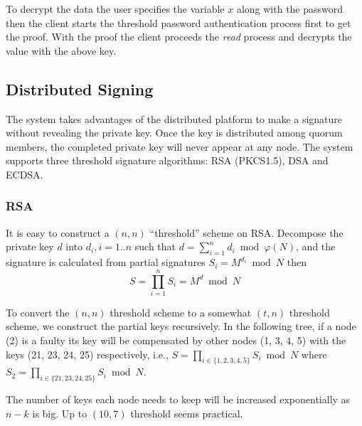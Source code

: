 \documentclass[twoside,twocolumn,10pt,fleqn]{article}
\begin{document}
To decrypt the data the user specifies the variable $x$ along with the
password then the client starts the threshold password authentication
process first to get the proof. With the proof the client proceeds the
{\em read} process and decrypts the value with the above key.

\subsection{Distributed Signing}
The system takes advantages of the distributed platform to make a
signature without revealing the private key. Once the key is
distributed among quorum members, the completed private key will never
appear at any node. The system supports three threshold signature
algorithms: RSA (PKCS1.5), DSA and ECDSA.

\subsubsection*{RSA}
It is easy to construct a $(n, n)$ ``threshold'' scheme on
RSA. Decompose the private key $d$ into $d_i, i = 1..n$ such that
$d = \sum_{i=1}^{n} d_i \bmod \varphi(N)$, and the signature is
calculated from partial signatures $S_i = M^{d_i} \bmod N$ then
\[
  S = \prod_{i=1}^{n} S_i = M^d \bmod N
\]

To convert the $(n, n)$ threshold scheme to a somewhat $(t, n)$
threshold scheme, we construct the partial keys recursively. In the
following tree, if a node (2) is a faulty its key will be compensated
by other nodes (1, 3, 4, 5) with the keys (21, 23, 24, 25)
respectively, i.e., $S = \prod_{i \in \{1,2,3,4,5\}} S_i \bmod N$
where $S_2 = \prod_{i \in \{21,23,24,25\}} S_i \bmod N$.


The number of keys each node needs to keep will be increased
exponentially as $n - k$ is big. Up to $(10,7)$ threshold seems
practical.
\end{document}
